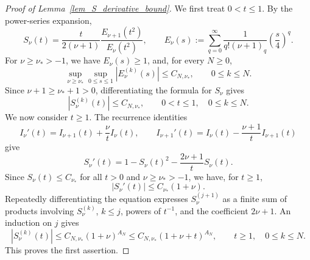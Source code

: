 \documentclass[12pt]{amsart}
\begin{document}
\begin{proof}[Proof of Lemma~\ref{lem_S_derivative_bound}]
We first treat $0<t\le1$. By the power-series expansion,
\begin{equation*}
    S_\nu(t)
    =
    \frac{t}{2(\nu+1)}
    \frac{E_{\nu+1}(t^2)}{E_\nu(t^2)},\qquad E_\nu(s):=
    \sum_{q=0}^\infty
    \frac{1}{q!(\nu+1)_q}
    \left(\frac{s}{4}\right)^q.
\end{equation*}
For $\nu\ge \nu_*>-1$, we have $E_\nu(s)\ge 1$, and, for every $N\ge 0$,
\begin{equation}\label{eq_A_derivatives_small}
    \sup_{\nu\geq\nu_*}\sup_{0\le s\leq1}
    \left|E_\nu^{(k)}(s)\right|
    \le
    C_{N,\nu_*},
    \qquad
    0\leq k\le N.
\end{equation}
Since $\nu+1\ge \nu_*+1>0$, differentiating the formula for $S_\nu$ gives
\begin{equation*}
    |S_\nu^{(k)}(t)|
    \le
    C_{N,\nu_*},
    \qquad
    0<t\leq1,\quad 0\leq k\le N.
\end{equation*}
We now consider $t\ge 1$. The recurrence identities
\begin{equation*}
    I_\nu'(t)=I_{\nu+1}(t)+\frac{\nu}{t}I_\nu(t),
    \qquad
    I_{\nu+1}'(t)=I_\nu(t)-\frac{\nu+1}{t}I_{\nu+1}(t)
\end{equation*}
give 
\begin{equation*}
    S_\nu'(t)
    =
    1-S_\nu(t)^2-\frac{2\nu+1}{t}S_\nu(t).
\end{equation*}
Since $S_\nu(t)\le C_{\nu_*}$ for all $t>0$ and $\nu\ge \nu_* >-1$, we have, for $t\geq1$,
\begin{equation*}
    |S_\nu'(t)|
    \leq
    C_{\nu_*}(1+\nu).
\end{equation*}
Repeatedly differentiating the equation expresses $S_\nu^{(j+1)}$ as a finite sum of products involving $S_\nu^{(k)}$, $k\leq j$, powers of $t^{-1}$, and the coefficient $2\nu+1$. An induction on $j$ gives
\begin{equation*}
    |S_\nu^{(k)}(t)|
    \leq
    C_{N,\nu_*}(1+\nu)^{A_N}
    \leq
    C_{N,\nu_*}(1+\nu+t)^{A_N},
    \qquad
    t\geq1,\quad 0\leq k\leq N.
\end{equation*}
This proves the first assertion.


\end{proof}
\end{document}
